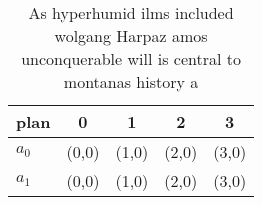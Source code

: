 \documentclass[a4paper]{article}
\begin{document}
\begin{table}
\begin{adjustbox}{width=0.9\columnwidth}
\begin{tabular}{|l|l|l|l|l|}
\hline
\textbf{plan} & \multicolumn{1}{c|}{\textbf{0}} & \multicolumn{1}{c|}{\textbf{1}} & \multicolumn{1}{c|}{\textbf{2}} & \multicolumn{1}{c|}{\textbf{3}} \\ \hline
\textbf{$a_0$}  & (0,0) & (1,0) & (2,0) & (3,0) \\ \hline
\textbf{$a_1$}  & (0,0) & (1,0) & (2,0) & (3,0) \\ \hline
\end{tabular}
\end{adjustbox}
\caption{As hyperhumid ilms included wolgang Harpaz amos unconquerable will is central to montanas history a
}
\end{table}
\end{document}
